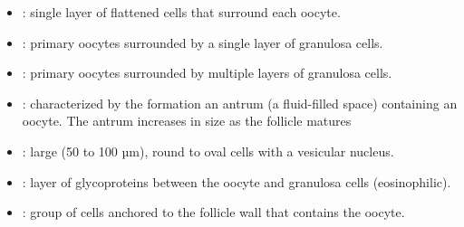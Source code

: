 \begin{multicols}{2}
\begin{itemize}
  \item {}: single layer of flattened cells that surround each oocyte.
  
  \begin{center}
  \end{center}
  
  \item {}: primary oocytes surrounded by a single layer of granulosa cells.
  
  \begin{center}
  \end{center}
  
  \item {}:  primary oocytes surrounded by multiple layers of granulosa cells.
  
  \begin{center}
  \end{center}
  
  \item {}: characterized by the formation an antrum (a fluid-filled space) containing an oocyte. The antrum increases in size as the follicle matures 
  
  \begin{center}
  \end{center}
   
  \item {}: large (50 to 100 µm), round to oval cells with a vesicular nucleus.
  
  \begin{center}
  \end{center}
  
  \item {}:  layer of glycoproteins between the oocyte and granulosa cells (eosinophilic).
  
  \begin{center}
  \end{center}
  
  \item {}: group of cells anchored to the follicle wall that contains the oocyte.
  

\end{itemize}
\end{multicols}
